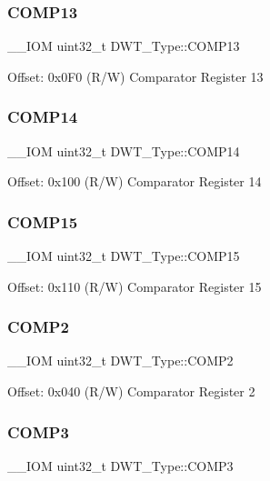 \subsubsection{\texorpdfstring{COMP13}{COMP13}}
{\footnotesize\ttfamily \+\_\+\+\_\+\+I\+OM uint32\+\_\+t D\+W\+T\+\_\+\+Type\+::\+C\+O\+M\+P13}

Offset\+: 0x0\+F0 (R/W) Comparator Register 13 \mbox{\label{struct_d_w_t___type_a85368a4ec78f4074e5f9cbba92ae1eb9}} 
\subsubsection{\texorpdfstring{COMP14}{COMP14}}
{\footnotesize\ttfamily \+\_\+\+\_\+\+I\+OM uint32\+\_\+t D\+W\+T\+\_\+\+Type\+::\+C\+O\+M\+P14}

Offset\+: 0x100 (R/W) Comparator Register 14 \mbox{\label{struct_d_w_t___type_aa46b44e5aacd3ca3937741f423ab480f}} 
\subsubsection{\texorpdfstring{COMP15}{COMP15}}
{\footnotesize\ttfamily \+\_\+\+\_\+\+I\+OM uint32\+\_\+t D\+W\+T\+\_\+\+Type\+::\+C\+O\+M\+P15}

Offset\+: 0x110 (R/W) Comparator Register 15 \mbox{\label{struct_d_w_t___type_a5ae6dde39989f27bae90afc2347deb46}} 
\subsubsection{\texorpdfstring{COMP2}{COMP2}}
{\footnotesize\ttfamily \+\_\+\+\_\+\+I\+OM uint32\+\_\+t D\+W\+T\+\_\+\+Type\+::\+C\+O\+M\+P2}

Offset\+: 0x040 (R/W) Comparator Register 2 \mbox{\label{struct_d_w_t___type_a85eb73d1848ac3f82d39d6c3e8910847}} 
\subsubsection{\texorpdfstring{COMP3}{COMP3}}
{\footnotesize\ttfamily \+\_\+\+\_\+\+I\+OM uint32\+\_\+t D\+W\+T\+\_\+\+Type\+::\+C\+O\+M\+P3}

